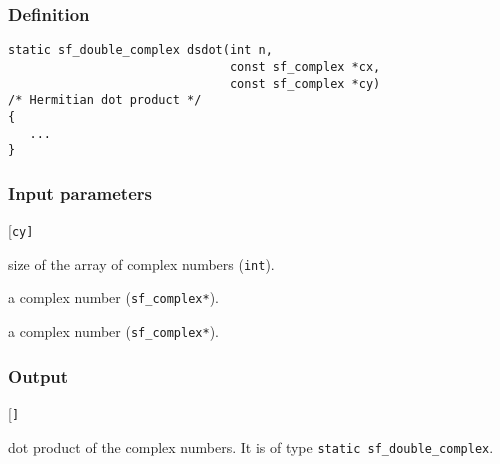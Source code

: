 \subsubsection*{Definition}
\begin{verbatim}
static sf_double_complex dsdot(int n, 
                               const sf_complex *cx, 
                               const sf_complex *cy)
/* Hermitian dot product */
{
   ...
}
\end{verbatim}

\subsubsection*{Input parameters}
\begin{desclist}{\tt }{\quad}[\tt cy]
   \setlength\itemsep{0pt}
   \item[n]  size of the array of complex numbers (\texttt{int}).  
   \item[cx] a complex number (\texttt{sf\_complex*}).  
   \item[cy] a complex number (\texttt{sf\_complex*}).  
\end{desclist}

\subsubsection*{Output}
\begin{desclist}{\tt }{\quad}[\tt ]
   \setlength\itemsep{0pt}  
   \item[prod] dot product of the complex numbers. It is of type \texttt{static sf\_double\_complex}.
\end{desclist}




